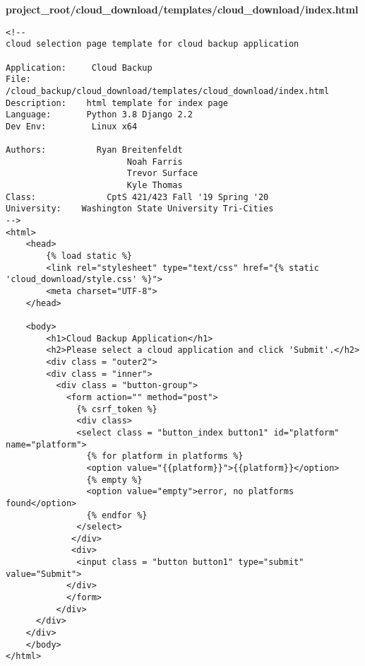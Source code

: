 \documentclass{article}
\begin{document}
\newpage
\textbf{project\_root/cloud\_download/templates/cloud\_download/index.html}
\begin{verbatim}
<!--
cloud selection page template for cloud backup application

Application:     Cloud Backup
File:                 /cloud_backup/cloud_download/templates/cloud_download/index.html
Description:    html template for index page
Language:       Python 3.8 Django 2.2
Dev Env:         Linux x64

Authors:          Ryan Breitenfeldt
                        Noah Farris
                        Trevor Surface
                        Kyle Thomas
Class:              CptS 421/423 Fall '19 Spring '20
University:    Washington State University Tri-Cities
-->
<html>
    <head>
        {% load static %}
        <link rel="stylesheet" type="text/css" href="{% static 'cloud_download/style.css' %}">
        <meta charset="UTF-8">
    </head>

    <body>
        <h1>Cloud Backup Application</h1>
        <h2>Please select a cloud application and click 'Submit'.</h2>
        <div class = "outer2">
        <div class = "inner">
          <div class = "button-group">
            <form action="" method="post">
              {% csrf_token %}
              <div class>
              <select class = "button_index button1" id="platform" name="platform">
                {% for platform in platforms %}
                <option value="{{platform}}">{{platform}}</option>
                {% empty %}
                <option value="empty">error, no platforms found</option>
                {% endfor %}
              </select>
             </div>
             <div>
              <input class = "button button1" type="submit" value="Submit"> 
            </div>
            </form>
          </div>
      </div>
    </div>
    </body>
</html>
\end{verbatim}
\end{document}
